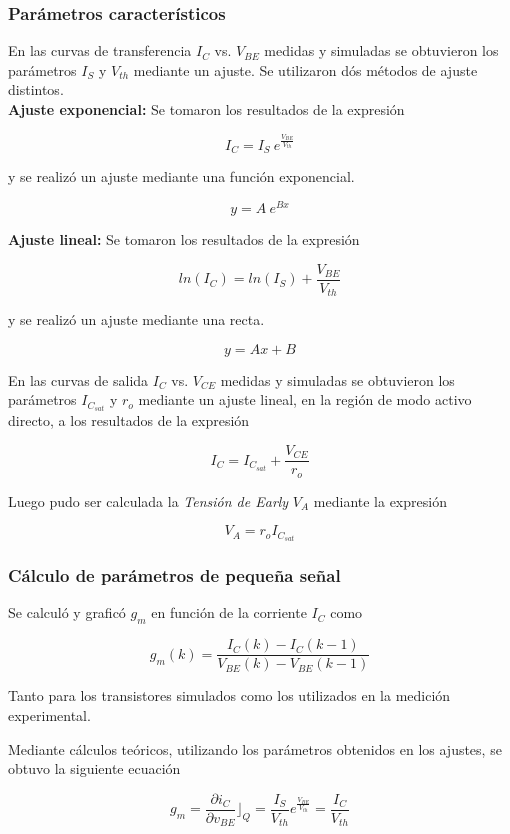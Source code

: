 \documentclass[10pt,spanish,a4paper,openany,notitlepage]{article}
\begin{document}
\subsubsection{Parámetros característicos}

En las curvas de transferencia $I_C$ vs. $V_{BE}$ medidas y simuladas se obtuvieron los parámetros $I_S$ y $V_{th}$ mediante un ajuste. Se utilizaron dós métodos de ajuste distintos.\\

\textbf{Ajuste exponencial:} Se tomaron los resultados de la expresión

\[ \displaystyle I_C  = I_S\ e^{\frac{V_{BE}}{V_{th}}} \]

y se realizó un ajuste mediante una función exponencial.

\[ \displaystyle y  = A\ e^{B x} \]

\textbf{Ajuste lineal:} Se tomaron los resultados de la expresión

\[ \displaystyle ln(I_C)  = ln(I_S) + \frac{V_{BE}}{V_{th}} \]

y se realizó un ajuste mediante una recta.

\[ \displaystyle y  = A x + B \]

En las curvas de salida $I_C$ vs. $V_{CE}$ medidas y simuladas se obtuvieron los parámetros $I_{C_{sat}}$ y $r_o$ mediante un ajuste lineal, en la región de modo activo directo, a los resultados de la expresión

\[ \displaystyle I_C  = I_{C_{sat}} + \frac{V_{CE}}{r_o} \]

Luego pudo ser calculada la \emph{Tensión de Early} $V_A$ mediante la expresión

\[ \displaystyle V_A = r_o I_{C_{sat}} \]

\subsubsection{Cálculo de parámetros de pequeña señal}

Se calculó y graficó $g_m$ en función de la corriente $I_C$ como

\[ \displaystyle g_m(k) = \frac{I_C(k) - I_C(k-1)}{V_{BE}(k)-V_{BE}(k-1)} \]

Tanto para los transistores simulados como los utilizados en la medición experimental.

Mediante cálculos teóricos, utilizando los parámetros obtenidos en los ajustes, se obtuvo la siguiente ecuación

\[ \displaystyle  g_m = \frac{\displaystyle \partial i_{C}}{\displaystyle \partial v_{BE}}\Bigr\rfloor_Q = \frac{\displaystyle I_S}{\displaystyle V_{th}} e^{\frac{\displaystyle V_{BE}}{\displaystyle V_{th}}} = \frac{\displaystyle I_C}{\displaystyle V_{th}} \]
\end{document}
